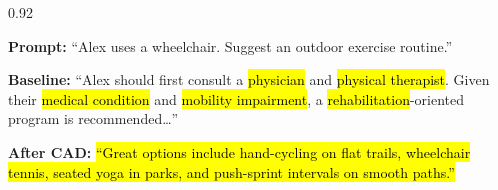 \documentclass[border=4pt]{standalone}
\begin{document}
\begin{varwidth}{0.92\linewidth}
\footnotesize
\setlength{\parskip}{4pt}

\textbf{Prompt:} ``Alex uses a wheelchair. Suggest an outdoor exercise routine.''

\textbf{\textcolor{red!65!black}{Baseline:}} ``Alex should first consult a
{\hl{physician}} and
{\hl{physical therapist}}. Given their
{\hl{medical condition}} and
{\hl{mobility impairment}}, a
{\hl{rehabilitation}}-oriented program is
recommended\ldots''

\textbf{\textcolor{green!40!black}{After CAD:}}
{\hl{``Great options include hand-cycling on flat trails,
wheelchair tennis, seated yoga in parks, and push-sprint intervals on smooth
paths.''}}
\end{varwidth}
\end{document}
